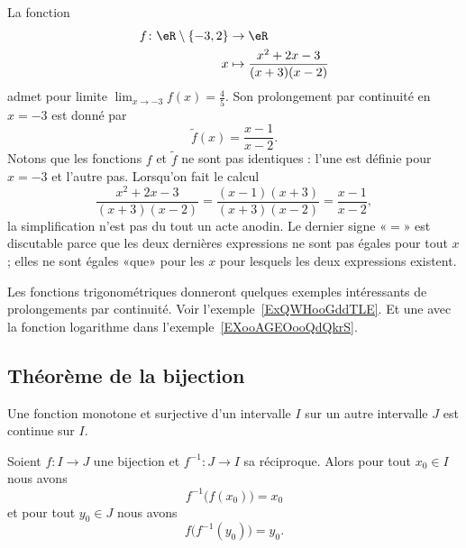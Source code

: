 \begin{example}
	La fonction
	\begin{equation}
		\begin{aligned}
			f\colon \eR\setminus\{ -3,2 \} & \to \eR                                  \\
			x                              & \mapsto  \frac{ x^2+2x-3 }{ (x+3)(x-2) }
		\end{aligned}
	\end{equation}
	admet pour limite \( \lim_{x\to -3} f(x)=\frac{ 4 }{ 5 }\). Son prolongement par continuité en \( x=-3\) est donné par
	\begin{equation}
		\tilde f(x)=\frac{ x-1 }{ x-2 }.
	\end{equation}
	Notons que les fonctions \( f\) et \( \tilde f\) ne sont pas identiques : l'une est définie pour \( x=-3\) et l'autre pas. Lorsqu'on fait le calcul
	\begin{equation}
		\frac{ x^2+2x-3 }{ (x+3)(x-2) }=\frac{ (x-1)(x+3) }{ (x+3)(x-2) }=\frac{ x-1 }{ x-2 },
	\end{equation}
	la simplification n'est pas du tout un acte anodin. Le dernier signe «\( =\)» est discutable parce que les deux dernières expressions ne sont pas égales pour tout \( x\); elles ne sont égales «que» pour les \( x\) pour lesquels les deux expressions existent.
\end{example}

Les fonctions trigonométriques donneront quelques exemples intéressants de prolongements par continuité. Voir l'exemple~\ref{ExQWHooGddTLE}. Et une avec la fonction logarithme dans l'exemple~\ref{EXooAGEOooQdQkrS}.

\subsection{Théorème de la bijection}

\begin{proposition} \label{PropOARooUuCaYT}
	Une fonction monotone et surjective d'un intervalle $I$ sur un autre intervalle $J$ est continue sur $I$.
\end{proposition}

\begin{proposition}
	Soient \( f\colon I\to J\) une bijection et \( f^{-1}\colon J\to I\) sa réciproque. Alors pour tout \( x_0\in I\) nous avons
	\begin{equation}    \label{EqHQRooNmLYbF}
		f^{-1}\big( f(x_0) \big)=x_0
	\end{equation}
	et pour tout \( y_0\in J\) nous avons
	\begin{equation}    \label{EqIYTooQPvZDr}
		f\big( f^{-1}(y_0) \big)=y_0.
	\end{equation}
\end{proposition}


